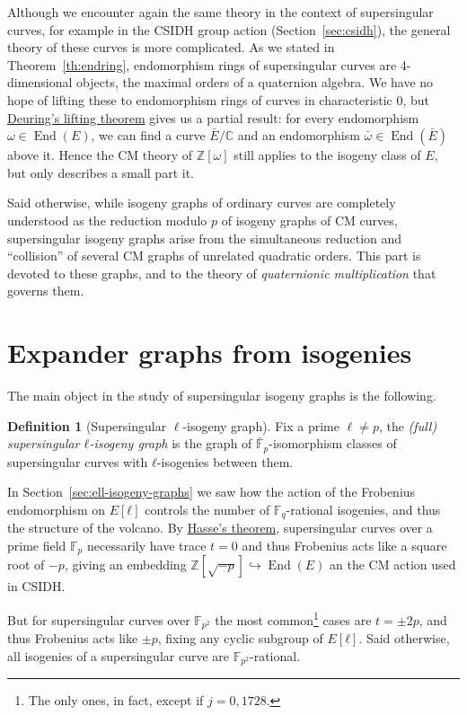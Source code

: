 \documentclass[10pt]{article}
\theoremstyle{plain}
\theoremstyle{definition}
\newtheorem{definition}[theorem]{Definition}
\DeclareMathOperator{\End}{End} %
\def\F{\ensuremath{\mathbb{F}}}
\begin{document}
Although we encounter again the same theory in the context of
supersingular curves, for example in the CSIDH group action
(Section~\ref{sec:csidh}), the general theory of these curves is more
complicated. %
As we stated in Theorem~\ref{th:endring}, endomorphism rings of
supersingular curves are 4-dimensional objects, the maximal orders of
a quaternion algebra. %
We have no hope of lifting these to endomorphism rings of curves in
characteristic 0, but \hyperref[th:deuring-lift]{Deuring's lifting
  theorem} gives us a partial result: for every endomorphism
$ω∈\End(E)$, we can find a curve $\bar{E}/ℂ$ and an endomorphism
$\bar{ω}∈\End(\bar{E})$ above it. %
Hence the CM theory of $ℤ[ω]$ still applies to the isogeny class of
$E$, but only describes a small part it.

Said otherwise, while isogeny graphs of ordinary curves are completely
understood as the reduction modulo $p$ of isogeny graphs of CM curves,
supersingular isogeny graphs arise from the simultaneous reduction and
``collision'' of several CM graphs of unrelated quadratic orders. %
This part is devoted to these graphs, and to the theory of
\emph{quaternionic multiplication} that governs them.


\section{Expander graphs from isogenies}

The main object in the study of supersingular isogeny graphs is the
following.

\begin{definition}[Supersingular $\ell$-isogeny graph]
  Fix a prime $\ell ≠ p$, the \emph{(full) supersingular $ℓ$-isogeny
    graph} is the graph of $\bar{\F}_p$-isomorphism classes of
  supersingular curves with $ℓ$-isogenies between them.
\end{definition}

In Section~\ref{sec:ell-isogeny-graphs} we saw how the action of the
Frobenius endomorphism on $E[ℓ]$ controls the number of
$\F_q$-rational isogenies, and thus the structure of the volcano. %
By \hyperref[th:hasse]{Hasse's theorem}, supersingular curves over a
prime field $\F_p$ necessarily have trace $t=0$ and thus Frobenius
acts like a square root of $-p$, giving an embedding
$ℤ[\sqrt{-p}] \hookrightarrow \End(E)$ an the CM action used in CSIDH.

But for supersingular curves over $\F_{p^2}$ the most
common\footnote{The only ones, in fact, except if $j=0,1728$.} cases
are $t = \pm 2p$, and thus Frobenius acts like $\pm p$, fixing any
cyclic subgroup of $E[ℓ]$. %
Said otherwise, all isogenies of a supersingular curve are
$\F_{p^2}$-rational.
\end{document}
